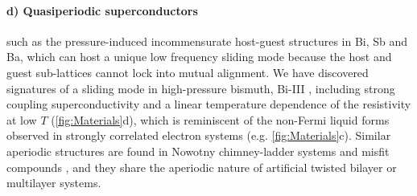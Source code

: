 %



\paragraph{d) Quasiperiodic superconductors} such as the pressure-induced incommensurate host-guest structures in Bi, Sb and Ba, which can host a unique low frequency sliding mode because the host and guest sub-lattices cannot lock into mutual alignment. %
We have discovered signatures of a sliding mode in high-pressure bismuth, Bi-III , including strong coupling superconductivity and a linear temperature dependence of the resistivity at low $T$  (\autoref{fig:Materials}d), which  is reminiscent of the non-Fermi liquid forms observed in strongly correlated electron systems (e.g. \autoref{fig:Materials}c). 
Similar aperiodic structures are found %
in  Nowotny chimney-ladder systems \cite{fredrickson04} and misfit compounds \cite{wiegers96}, and they share the aperiodic nature of artificial twisted bilayer or multilayer systems. 

